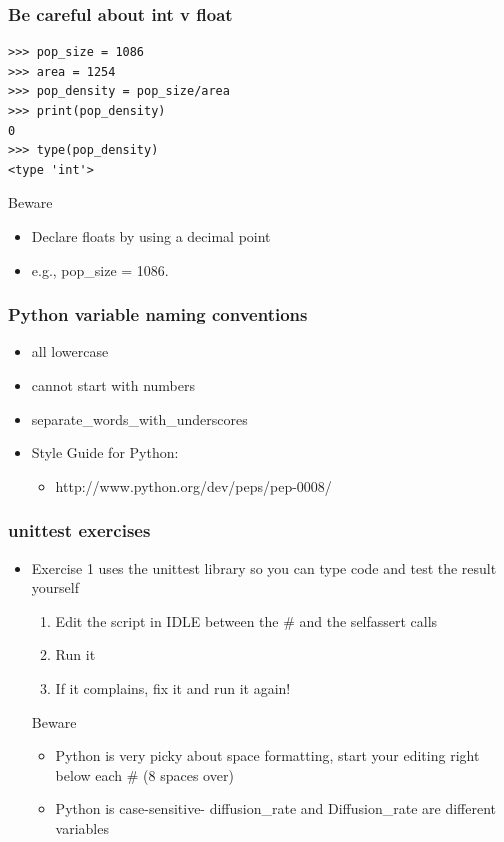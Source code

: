 \documentclass{beamer}
\begin{document}
\begin{frame}[fragile]
\frametitle{Be careful about int v float}
\begin{lstlisting}
>>> pop_size = 1086
>>> area = 1254
>>> pop_density = pop_size/area
>>> print(pop_density)
0
>>> type(pop_density)
<type 'int'>
\end{lstlisting}
\begin{alertblock}{Beware}
\begin{itemize}
\item Declare floats by using a decimal point
\item e.g., pop\_size = 1086.
\end{itemize}
\end{alertblock}
\end{frame}

\begin{frame}[fragile]
\frametitle{Python variable naming conventions}
\begin{itemize}
\item all lowercase
\item cannot start with numbers
\item separate\_words\_with\_underscores
\item Style Guide for Python: 
\begin{itemize}
\item http://www.python.org/dev/peps/pep-0008/
\end{itemize}
\end{itemize}
\end{frame}

\begin{frame}[fragile]
\frametitle{unittest exercises}
\begin{itemize}
\item Exercise 1 uses the unittest library so you can type code and test the result yourself  
\begin{enumerate}
  \item Edit the script in IDLE between the \# and the selfassert calls
  \item Run it 
  \item If it complains, fix it and run it again!
\end{enumerate}
\begin{alertblock}{Beware}
\begin{itemize}
\item Python is very picky about space formatting, start your editing right below each \# (8 spaces over)
\item Python is case-sensitive- diffusion\_rate and Diffusion\_rate are different variables
\end{itemize}
\end{alertblock}
\end{itemize}
\end{frame}
\end{document}
